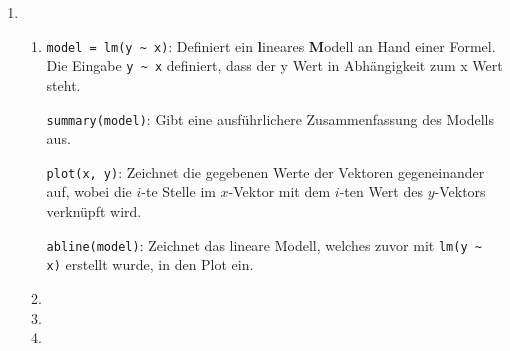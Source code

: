 \documentclass[a4paper]{scrartcl}
\def \blattnr {10}
\begin{document}
\begin{enumerate}[label=\bfseries \blattnr.\arabic*]
\begin{enumerate}
    \end{enumerate}

  \item %
    \begin{enumerate}
     \item %
    \lstinline{model = lm(y ~ x)}: Definiert ein \textbf{l}ineares
    \textbf{M}odell an Hand einer Formel. Die Eingabe \lstinline{y ~ x}
    definiert, dass der y Wert in Abhängigkeit zum x Wert steht.

    \lstinline{summary(model)}: Gibt eine ausführlichere Zusammenfassung des
    Modells aus.
	
    \lstinline{plot(x, y)}: Zeichnet die gegebenen Werte der Vektoren
    gegeneinander auf, wobei die $i$-te Stelle im $x$-Vektor mit dem $i$-ten
    Wert des $y$-Vektors verknüpft wird.
	
	\lstinline{abline(model)}: Zeichnet das lineare Modell, welches zuvor mit 
    \lstinline{lm(y ~ x)} erstellt wurde, in den Plot ein.
     \item %
     \item %
     \item %
    \end{enumerate}
\end{enumerate}
\end{document}
